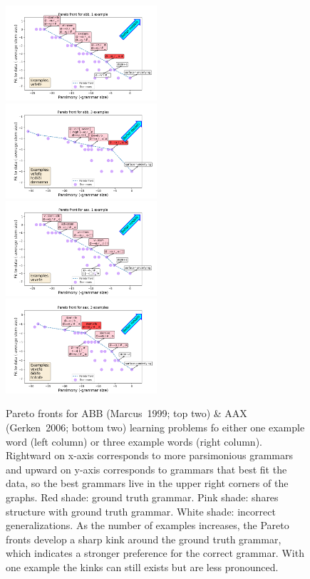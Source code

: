 \documentclass{article}
\begin{document}
\begin{figure}[H]

\includegraphics[width = 0.5\textwidth]{abb1.png} \includegraphics[width = 0.5\textwidth]{abb3.png}
\includegraphics[width = 0.5\textwidth]{aax1.png} \includegraphics[width = 0.5\textwidth]{aax3.png}
  
  \caption{Pareto fronts for ABB  (Marcus~1999; top two) \& AAX  (Gerken~2006; bottom two) learning problems fo either one example word (left column) or three example words  (right column). Rightward on x-axis corresponds to more parsimonious grammars and upward on y-axis corresponds to grammars that best fit the data, so the best grammars live in the upper right corners of the graphs. {\color{red}Red shade}: ground truth grammar. {\color{red!60}Pink shade}: shares structure with ground truth grammar. White shade: incorrect generalizations. As the number of examples increases, the Pareto fronts develop a sharp kink around the ground truth grammar, which indicates a stronger preference for the correct grammar. With one example the kinks can still exists but are less pronounced.}\label{quadrupleFrontier}
\end{figure}
\end{document}
